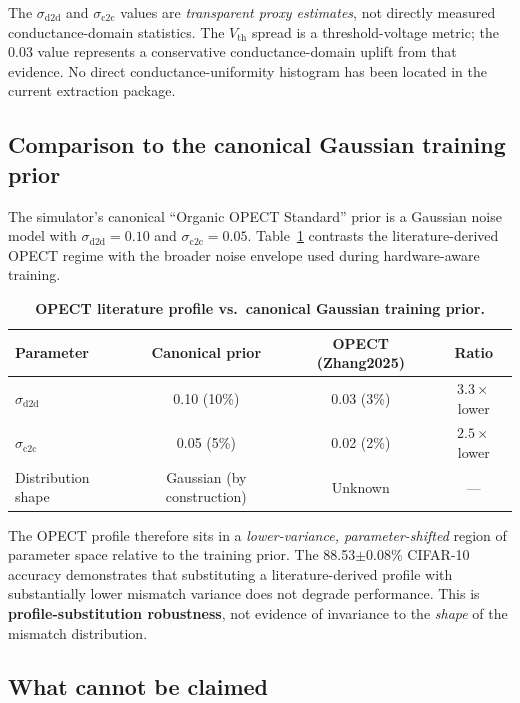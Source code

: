 The $\sigma_{\text{d2d}}$ and $\sigma_{\text{c2c}}$ values are \emph{transparent proxy estimates}, not directly measured conductance-domain statistics. The $V_{\text{th}}$ spread is a threshold-voltage metric; the 0.03 value represents a conservative conductance-domain uplift from that evidence. No direct conductance-uniformity histogram has been located in the current extraction package.

\subsection{Comparison to the canonical Gaussian training prior}

The simulator's canonical ``Organic OPECT Standard'' prior is a Gaussian noise model with $\sigma_{\text{d2d}}=0.10$ and $\sigma_{\text{c2c}}=0.05$. Table~\ref{tab:opect-vs-canonical} contrasts the literature-derived OPECT regime with the broader noise envelope used during hardware-aware training.

\begin{table}[ht]
\centering
\caption{\textbf{OPECT literature profile vs.~canonical Gaussian training prior.}}
\label{tab:opect-vs-canonical}
\begin{tabular}{@{}lccc@{}}
\toprule
Parameter & Canonical prior & OPECT (Zhang2025) & Ratio \\
\midrule
$\sigma_{\text{d2d}}$ & 0.10 (10\%) & 0.03 (3\%) & $3.3\times$ lower \\
$\sigma_{\text{c2c}}$ & 0.05 (5\%) & 0.02 (2\%) & $2.5\times$ lower \\
Distribution shape & Gaussian (by construction) & Unknown & --- \\
\bottomrule
\end{tabular}
\end{table}

The OPECT profile therefore sits in a \emph{lower-variance, parameter-shifted} region of parameter space relative to the training prior. The 88.53$\pm$0.08\% CIFAR-10 accuracy demonstrates that substituting a literature-derived profile with substantially lower mismatch variance does not degrade performance. This is \textbf{profile-substitution robustness}, not evidence of invariance to the \emph{shape} of the mismatch distribution.

\subsection{What cannot be claimed}

